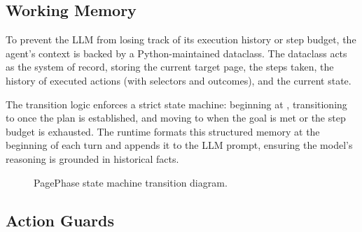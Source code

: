 \subsection{Working Memory}
\label{sec:working-memory}

To prevent the LLM from losing track of its execution history or step budget, the agent's context is backed by a Python-maintained  dataclass. The dataclass acts as the system of record, storing the current target page, the steps taken, the history of executed actions (with selectors and outcomes), and the current  state. 

The  transition logic enforces a strict state machine: beginning at , transitioning to  once the plan is established, and moving to  when the goal is met or the step budget is exhausted. The runtime formats this structured memory at the beginning of each turn and appends it to the LLM prompt, ensuring the model's reasoning is grounded in historical facts.

\begin{figure}[htbp]
  \centering
  \caption{PagePhase state machine transition diagram.}
  \label{fig:pagephase-state}
\end{figure}

\subsection{Action Guards}
\label{sec:action-guards}


